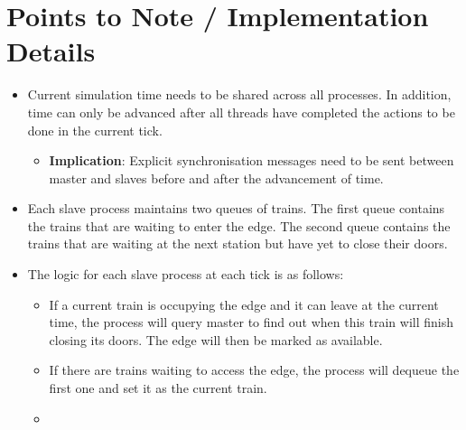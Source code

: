 \documentclass[a4paper,12pt]{article}
\begin{document}
\section{Points to Note / Implementation Details}
\begin{itemize}
	\item Current simulation time needs to be shared across all processes. In addition, time can only be advanced after all threads have completed the actions to be done in the current tick.
    \begin{itemize}
      \item \textbf{Implication}: Explicit synchronisation messages need to be sent between master and slaves before and after the advancement of time.
    \end{itemize}
  \item Each slave process maintains two queues of trains. The first queue contains the trains that are waiting to enter the edge. The second queue contains the trains that are waiting at the next station but have yet to close their doors.
  \item The logic for each slave process at each tick is as follows:
    \begin{itemize}
      \item If a current train is occupying the edge and it can leave at the current time, the process will query master to find out when this train will finish closing its doors. The edge will then be marked as available.
      \item If there are trains waiting to access the edge, the process will dequeue the first one and set it as the current train.
      \item


\end{itemize}
\end{itemize}
\end{document}
